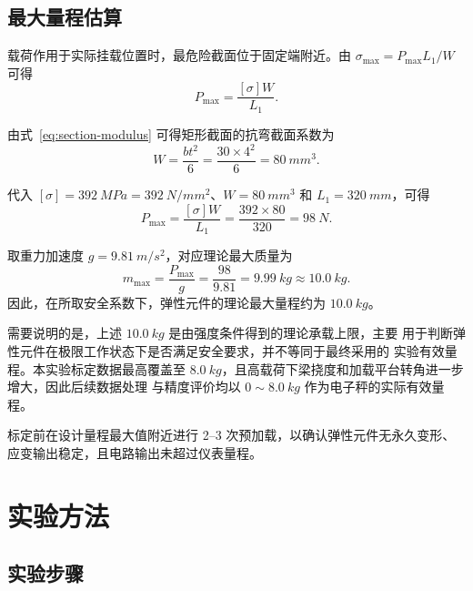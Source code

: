 \documentclass[UTF8,a4paper,zihao=5]{ctexart}
\begin{document}
\subsection{最大量程估算}

载荷作用于实际挂载位置时，最危险截面位于固定端附近。由
\(\sigma_{\max}=P_{\max}L_1/W\) 可得
\begin{equation}
  P_{\max}=\frac{[\sigma]W}{L_1}.
  \label{eq:max-load}
\end{equation}

由式~\ref{eq:section-modulus} 可得矩形截面的抗弯截面系数为
\begin{equation}
  W=\frac{bt^2}{6}
  =\frac{30\times 4^2}{6}
  =\SI{80}{mm^3}.
  \label{eq:section-modulus-value}
\end{equation}

代入 \([\sigma]=\SI{392}{MPa}=\SI{392}{N/mm^2}\)、\(W=\SI{80}{mm^3}\)
和 \(L_1=\SI{320}{mm}\)，可得
\begin{equation}
  P_{\max}
  =\frac{[\sigma]W}{L_1}
  =\frac{392\times 80}{320}
  =\SI{98}{N}.
  \label{eq:max-load-value}
\end{equation}

取重力加速度 \(g=\SI{9.81}{m/s^2}\)，对应理论最大质量为
\begin{equation}
  m_{\max}=\frac{P_{\max}}{g}
  =\frac{98}{9.81}
  =\SI{9.99}{kg}\approx \SI{10.0}{kg}.
  \label{eq:max-mass}
\end{equation}
因此，在所取安全系数下，弹性元件的理论最大量程约为 \(\SI{10.0}{kg}\)。

需要说明的是，上述 \(\SI{10.0}{kg}\) 是由强度条件得到的理论承载上限，主要
用于判断弹性元件在极限工作状态下是否满足安全要求，并不等同于最终采用的
实验有效量程。本实验标定数据最高覆盖至
\(\SI{8.0}{kg}\)，且高载荷下梁挠度和加载平台转角进一步增大，因此后续数据处理
与精度评价均以 \(0\sim\SI{8.0}{kg}\) 作为电子秤的实际有效量程。


标定前在设计量程最大值附近进行 2--3 次预加载，以确认弹性元件无永久变形、
应变输出稳定，且电路输出未超过仪表量程。

\section{实验方法}

\subsection{实验步骤}
\end{document}
